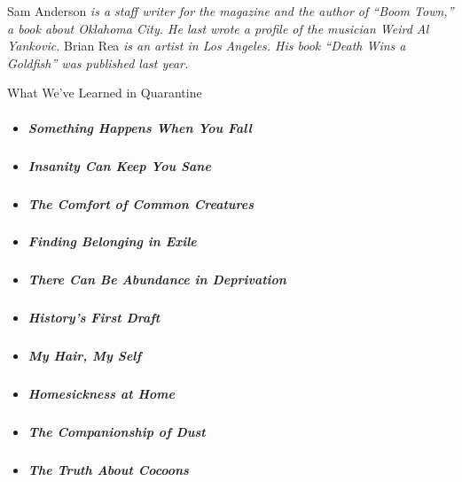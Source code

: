 Sam Anderson \emph{is a staff writer for the magazine and the author of
``Boom Town,'' a book about Oklahoma City. He last wrote a profile of
the musician Weird Al Yankovic.} Brian Rea \emph{is an artist in Los
Angeles. His book ``Death Wins a Goldfish'' was published last year.}

What We've Learned in Quarantine

\begin{itemize}
\item
  \protect\hyperlink{willi-ruge-photographs}{}

  \hypertarget{something-happens-when-you-fall}{%
  \subparagraph{Something Happens When You
  Fall}\label{something-happens-when-you-fall}}
\item
  \protect\hyperlink{insanity}{}

  \hypertarget{insanity-can-keep-you-sane}{%
  \subparagraph{Insanity Can Keep You
  Sane}\label{insanity-can-keep-you-sane}}
\item
  \protect\hyperlink{nature}{}

  \hypertarget{the-comfort-of-common-creatures}{%
  \subparagraph{The Comfort of Common
  Creatures}\label{the-comfort-of-common-creatures}}
\item
  \protect\hyperlink{paris}{}

  \hypertarget{finding-belonging-in-exile}{%
  \subparagraph{Finding Belonging in
  Exile}\label{finding-belonging-in-exile}}
\item
  \protect\hyperlink{recovery}{}

  \hypertarget{there-can-be-abundance-in-deprivation}{%
  \subparagraph{There Can Be Abundance in
  Deprivation}\label{there-can-be-abundance-in-deprivation}}
\item
  \protect\hyperlink{diary}{}

  \hypertarget{historys-first-draft}{%
  \subparagraph{History's First Draft}\label{historys-first-draft}}
\item
  \protect\hyperlink{hair}{}

  \hypertarget{my-hair-my-self}{%
  \subparagraph{My Hair, My Self}\label{my-hair-my-self}}
\item
  \protect\hyperlink{homesickness}{}

  \hypertarget{homesickness-at-home}{%
  \subparagraph{Homesickness at Home}\label{homesickness-at-home}}
\item
  \protect\hyperlink{dusting}{}

  \hypertarget{the-companionship-of-dust}{%
  \subparagraph{The Companionship of
  Dust}\label{the-companionship-of-dust}}
\item
  \protect\hyperlink{cocoons}{}

  \hypertarget{the-truth-about-cocoons}{%
  \subparagraph{The Truth About Cocoons}\label{the-truth-about-cocoons}}
\end{itemize}

